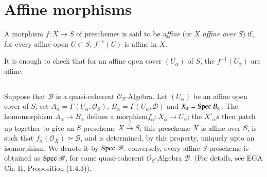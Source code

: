 \section{Affine morphisms}\label{chap2-sec2.6}%

\begin{defin}\label{chap2-defi2.6.1}%
A morphism $f:X\to S$ of preschemes is said to be {\em affine} (or $X$
{\em affine over} $S$) if, for every affine open $U\subset S$,
$f^{-1}(U)$ is affine in $X$.
\end{defin}

It is enough to check that for an affine open cover $(U_{\alpha})$ of
$S$, the $f^{-1}(U_{\alpha})$ are affine.

\setcounter{subsection}{1}
\subsection{}\label{chap2-sec2.6.2}%

Suppose that $\mathscr{B}$ is a quasi-coherent
$\mathscr{O}_{S}$-Algebra. Let $(U_{\alpha})$ be an affine open cover
of $S$; set $A_{\alpha}=\Gamma(U_{\alpha},\mathscr{O}_{S})$,
$B_{\alpha}=\Gamma(U_{\alpha},\mathscr{B})$ and $X_{\alpha}=\operatorname{Spec}
B_{\alpha}$. The homomorphism $A_{\alpha}\to B_{\alpha}$ defines a
morphism\pageoriginale $f_{\alpha}:X_{\alpha}\to U_{\alpha}$; the
$X'_{\alpha} s$ then patch up together to give an $S$-prescheme
$X\xrightarrow{f}S$; this prescheme $X$ is affine over $S$, is such
that $f_{\alpha}(\mathscr{O}_{X})\simeq \mathscr{B}$, and is
determined, by this property, uniquely upto an isomorphism. We denote
it by $\operatorname{Spec}\mathscr{B}$. conversely, every affine $S$-prescheme is
obtained as $\operatorname{Spec} \mathscr{B}$, for some quasi-coherent
$\mathscr{O}_{S}$-Algebra $\mathscr{B}$. (For details, see EGA Ch. II,
Proposition (1.4.3)).

